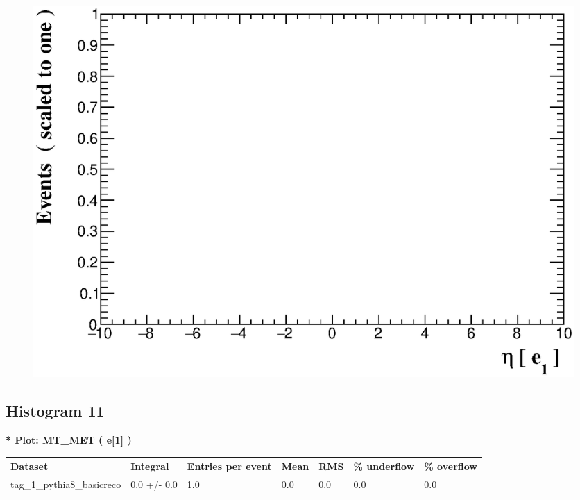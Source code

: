 \documentclass[a4paper, 10pt]{article}
\begin{document}
\begin{figure}[H]
  \begin{center}
    \includegraphics[scale=0.45]{selection_9.eps}\\
\caption{   }
  \end{center}
\end{figure}
      \newpage
\subsection{ Histogram 11}

\textbf{* Plot: MT\_MET ( e[1] ) }\\
   \begin{table}[H]
  \begin{center}
    \begin{tabular}{|m{23.0mm}|m{23.0mm}|m{18.0mm}|m{19.0mm}|m{19.0mm}|m{19.0mm}|m{19.0mm}|}
      \hline
      {\cellcolor{yellow}         Dataset}& {\cellcolor{yellow}         Integral}& {\cellcolor{yellow}         Entries per event}& {\cellcolor{yellow}         Mean}& {\cellcolor{yellow}         RMS}& {\cellcolor{yellow}         \% underflow}& {\cellcolor{yellow}         \% overflow}\\
      \hline
      {\cellcolor{white}         tag\_1\_pythia8\_basicreco}& {\cellcolor{white}         0.0 +/\-- 0.0}& {\cellcolor{white}         1.0}& {\cellcolor{white}         0.0}& {\cellcolor{white}         0.0}& {\cellcolor{green}         0.0}& {\cellcolor{green}         0.0}\\
\hline
    \end{tabular}
  \end{center}
\end{table}
\end{document}
